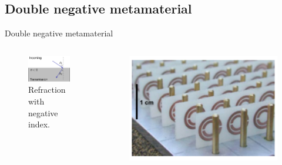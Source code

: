 \subsection{Double negative metamaterial}

\begin{frame}{Double negative metamaterial}
    \begin{columns}

        \begin{figure}
            \centering
            \includegraphics[width=\textwidth]{Figures/LH_Snell.pdf}
            \caption{Refraction with negative index.}
            \label{fig:LH_snell}
        \end{figure}
        \vspace{-8mm}
        \begin{figure}
            \centering
            \includegraphics[width=\textwidth]{Figures/Negative_index.pdf}

\end{figure}
\end{columns}
\end{frame}
